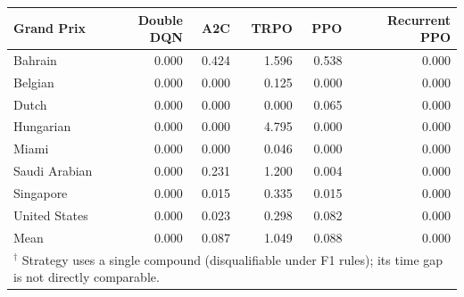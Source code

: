 \begin{tabular}{lrrrrr}
\toprule
Grand Prix & Double DQN & A2C & TRPO & PPO & Recurrent PPO \\
\midrule
Bahrain & 0.000 & 0.424 & 1.596 & 0.538 & 0.000 \\
Belgian & 0.000 & 0.000 & 0.125 & 0.000 & 0.000 \\
Dutch & 0.000 & 0.000 & 0.000 & 0.065 & 0.000 \\
Hungarian & 0.000 & 0.000 & 4.795 & 0.000 & 0.000 \\
Miami & 0.000 & 0.000 & 0.046 & 0.000 & 0.000 \\
Saudi Arabian & 0.000 & 0.231 & 1.200 & 0.004 & 0.000 \\
Singapore & 0.000 & 0.015 & 0.335 & 0.015 & 0.000 \\
United States & 0.000 & 0.023 & 0.298 & 0.082 & 0.000 \\
\midrule
Mean & 0.000 & 0.087 & 1.049 & 0.088 & 0.000 \\
\bottomrule
\multicolumn{6}{l}{\footnotesize $^\dagger$ Strategy uses a single compound (disqualifiable under F1 rules); its time gap is not directly comparable.} \\
\end{tabular}